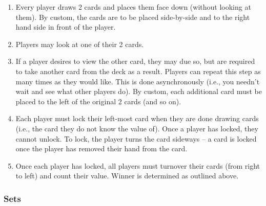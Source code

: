 \documentclass[11pt]{article}
\begin{document}
\begin{enumerate}
\begin{enumerate}
\item Every player draws 2 cards and places them face down (without
looking at them). By custom, the cards are to be placed
side-by-side and to the right hand side in front of the player.
\item Players may look at one of their 2 cards.
\item If a player desires to view the other card, they may due so, but
are required to take another card from the deck as a result.
Players can repeat this step as many times as they would like. This
is done asynchronously (i.e., you needn't wait and see what other
players do). By custom, each additional card must be placed to the
left of the original 2 cards (and so on).
\item Each player must lock their left-most card when they are done
drawing cards (i.e., the card they do not know the value of). Once
a player has locked, they cannot unlock. To lock, the player turns
the card sideways -- a card is locked once the player has removed
their hand from the card.
\item Once each player has locked, all players must turnover their cards
(from right to left) and count their value. Winner is determined as
outlined above.
\end{enumerate}
\end{enumerate}

\subsubsection{Sets}
\label{sec-2-2-3}
\end{document}
